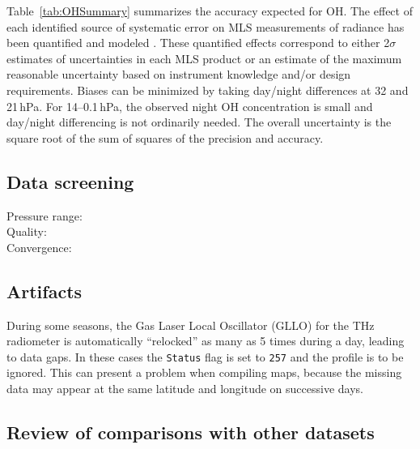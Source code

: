 Table~\ref{tab:OHSummary} summarizes the accuracy expected for OH\@. The effect of each identified source of systematic error on MLS measurements of radiance has been quantified and modeled \citep{ReadEtal:2007}. These quantified effects correspond to either 2$\sigma$ estimates of uncertainties in each MLS product or an estimate of the maximum reasonable uncertainty based on instrument knowledge and/or design requirements. Biases can be minimized by taking day/night differences at 32 and 21\,hPa. For 14--0.1\,hPa, the observed night OH concentration is small and day/night differencing is not ordinarily needed. The overall uncertainty is the square root of the sum of squares of the precision and accuracy.

\begin{nofloatpages}
\subsection{Data screening}
\label{sec:OHScreening}

\begin{description}
  \item[Pressure range:]  \standardrangestatement \standardprecisionrule \evenstatusrule
  \item[Quality:] 
  \item[Convergence:] 
\end{description}
\end{nofloatpages}

\subsection{Artifacts}

During some seasons, the Gas Laser Local Oscillator (GLLO) for the THz radiometer is automatically ``relocked'' as many as 5 times during a day, leading to data gaps. In these cases the \texttt{Status} flag is set to \texttt{257} and the profile is to be ignored. This can present a problem when compiling maps, because the missing data may appear at the same latitude and longitude on successive days.

\subsection{Review of comparisons with other datasets}

